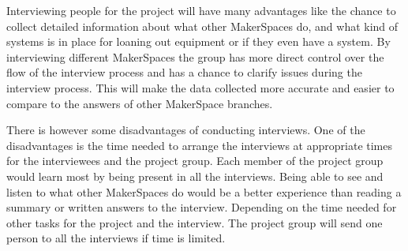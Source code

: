 Interviewing people for the project will have many advantages like the chance to collect detailed information about what other MakerSpaces do, and what kind of systems is in place for loaning out equipment or if they even have a system. By interviewing different MakerSpaces the group has more direct control over the flow of the interview process and has a chance to clarify issues during the interview process. This will make the data collected more accurate and easier to compare to the answers of other MakerSpace branches.

There is however some disadvantages of conducting interviews. One of the disadvantages is the time needed to arrange the interviews at appropriate times for the interviewees and the project group. Each member of the project group would learn most by being present in all the interviews. Being able to see and listen to what other MakerSpaces do would be a better experience than reading a summary or written answers to the interview. Depending on the time needed for other tasks for the project and the interview. The project group will send one person to all the interviews if time is limited.    
